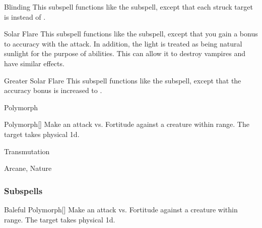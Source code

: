 \begin{ability}[\nth{4}]{Blinding}
This subspell functions like the  subspell, except that each struck target is  instead of .
\end{ability}
\vspace{0.25em}


\begin{ability}[\nth{4}]{Solar Flare}
This subspell functions like the  subspell, except that you gain a  bonus to accuracy with the attack.
In addition, the light is treated as being natural sunlight for the purpose of abilities.
This can allow it to destroy vampires and have similar effects.
\end{ability}
\vspace{0.25em}


\begin{ability}[\nth{7}]{Greater Solar Flare}
This subspell functions like the  subspell, except that the accuracy bonus is increased to .
\end{ability}
\vspace{0.25em}

\newpage
\begin{spellsection}{Polymorph}

\begin{spellheader}
\end{spellheader}


\begin{ability}{Polymorph}[]
Make an attack vs. Fortitude against a creature within \rngmed range.
\hit The target takes physical  \minus1d.
\end{ability}




 Transmutation

 Arcane, Nature
\end{spellsection}


\subsubsection{Subspells}


\begin{ability}[\nth{1}]{Baleful Polymorph}[]
Make an attack vs. Fortitude against a creature within \rngmed range.
\hit The target takes physical  \plus1d.
\end{ability}
\vspace{0.25em}


